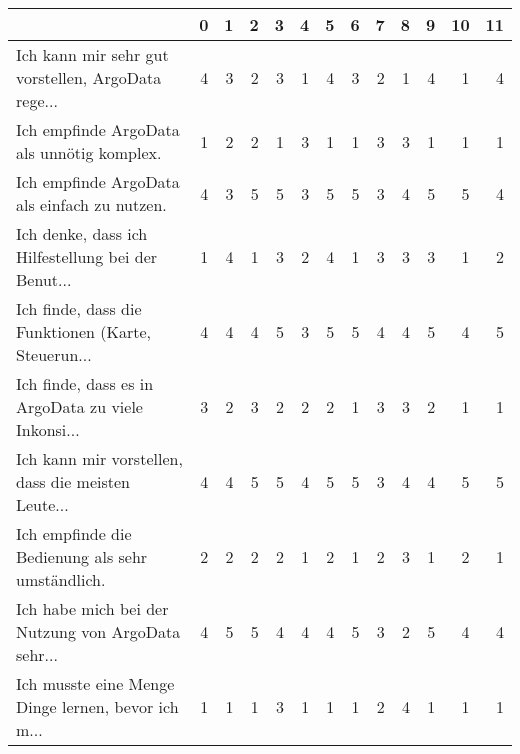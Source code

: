 \begin{tabular}{lrrrrrrrrrrrr}
\toprule
{} &  0  &  1  &  2  &  3  &  4  &  5  &  6  &  7  &  8  &  9  &  10 &  11 \\
\midrule
Ich kann mir sehr gut vorstellen, ArgoData rege... &   4 &   3 &   2 &   3 &   1 &   4 &   3 &   2 &   1 &   4 &   1 &   4 \\
Ich empfinde ArgoData als unnötig komplex.         &   1 &   2 &   2 &   1 &   3 &   1 &   1 &   3 &   3 &   1 &   1 &   1 \\
Ich empfinde ArgoData als einfach zu nutzen.       &   4 &   3 &   5 &   5 &   3 &   5 &   5 &   3 &   4 &   5 &   5 &   4 \\
Ich denke, dass ich Hilfestellung bei der Benut... &   1 &   4 &   1 &   3 &   2 &   4 &   1 &   3 &   3 &   3 &   1 &   2 \\
Ich finde, dass die Funktionen (Karte, Steuerun... &   4 &   4 &   4 &   5 &   3 &   5 &   5 &   4 &   4 &   5 &   4 &   5 \\
Ich finde, dass es in ArgoData zu viele Inkonsi... &   3 &   2 &   3 &   2 &   2 &   2 &   1 &   3 &   3 &   2 &   1 &   1 \\
Ich kann mir vorstellen, dass die meisten Leute... &   4 &   4 &   5 &   5 &   4 &   5 &   5 &   3 &   4 &   4 &   5 &   5 \\
Ich empfinde die Bedienung als sehr umständlich.   &   2 &   2 &   2 &   2 &   1 &   2 &   1 &   2 &   3 &   1 &   2 &   1 \\
Ich habe mich bei der Nutzung von ArgoData sehr... &   4 &   5 &   5 &   4 &   4 &   4 &   5 &   3 &   2 &   5 &   4 &   4 \\
Ich musste eine Menge Dinge lernen, bevor ich m... &   1 &   1 &   1 &   3 &   1 &   1 &   1 &   2 &   4 &   1 &   1 &   1 \\
\bottomrule
\end{tabular}
